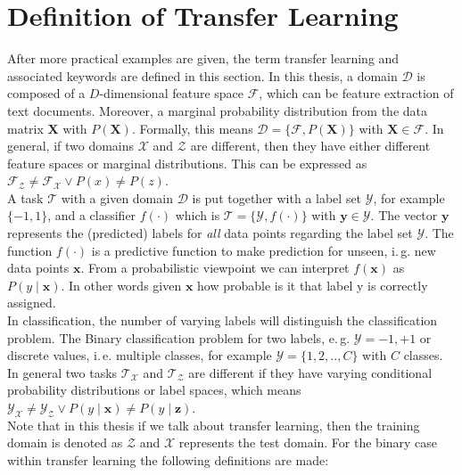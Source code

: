 \section{Definition of Transfer Learning}\label{TlSecDef}
After more practical examples are given, the term transfer learning and associated keywords are defined in this section.\newline
In this thesis, a domain $\mathcal{D}$ is composed of a $D$-dimensional feature space $\mathcal{F}$, which can be feature extraction of text documents. Moreover, a marginal probability distribution from the data matrix $\mathbf{X}$ with $P(\mathbf{X})$.
Formally, this means $\mathcal{D} = \{\mathcal{F},P(\mathbf{X})\}$ with $\mathbf{X} \in \mathcal{F}$.
In general, if two domains $\mathcal{X}$ and $\mathcal{Z}$ are different, then they have either different feature spaces or marginal distributions.
This can be expressed as $\mathcal{F_{Z}} \neq \mathcal{F_{X}} \vee P(x) \neq \textit{P}(z)$.\cite[. 542]{Aggarwal.2015}\\
A task $\mathcal{T}$ with a given domain $\mathcal{D}$ is put together with a label set $\mathcal{Y}$, for example $\{-1,1\}$, and a classifier $f(\cdot)$ which is  $\mathcal{T} = \{\mathcal{Y},\textit{f}(\cdot)\}$ with $\mathbf{y} \in \mathcal{Y}$.
The vector $\mathbf{y}$ represents the (predicted) labels for \textit{all} data points regarding the label set $\mathcal{Y}$.
The function $f(\cdot)$ is a predictive function to make prediction for unseen, i.\,g. new data points $\mathbf{x}$.
From a probabilistic viewpoint we can interpret $f(\mathbf{x})$ as $P(y\mid \mathbf{x})$.
In other words given $\mathbf{x}$ how probable is it that label y is correctly assigned.\\
In classification, the number of varying labels will distinguish the classification problem.
The Binary classification problem for two labels, e.\,g. $\mathcal{Y} ={-1,+1}$ or discrete values, i.\,e. multiple classes, for example $\mathcal{Y}= \{1,2,..,C\}$ with $C$ classes.
In general two tasks $\mathcal{T_X}$ and $\mathcal{T_{Z}}$ are different if they have varying conditional probability distributions or label spaces, which means $\mathcal{Y_{X}} \neq \mathcal{Y_{Z}} \vee P(y\mid \mathbf{x}) \neq P(y\mid \mathbf{z})$.\cite[p. 542]{Aggarwal.2015}\\ 
Note that in this thesis if we talk about transfer learning, then the training domain is denoted as $\mathcal{Z}$ and $\mathcal{X}$ represents the test domain.
For the binary case within transfer learning the following definitions are made:
